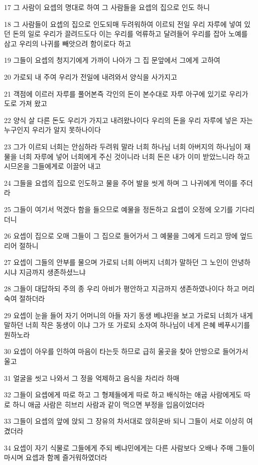 \par 17 그 사람이 요셉의 명대로 하여 그 사람들을 요셉의 집으로 인도 하니
\par 18 그 사람들이 요셉의 집으로 인도되매 두려워하여 이르되 전일 우리 자루에 넣여 있던 돈의 일로 우리가 끌려드도다 이는 우리를 억류하고 달려들어 우리를 잡아 노예를 삼고 우리의 나귀를 빼앗으려 함이로다 하고
\par 19 그들이 요셉의 청지기에게 가까이 나아가 그 집 문앞에서 그에게 고하여
\par 20 가로되 내 주여 우리가 전일에 내려와서 양식을 사가지고
\par 21 객점에 이르러 자루를 풀어본즉 각인의 돈이 본수대로 자루 아구에 있기로 우리가 도로 가져 왔고
\par 22 양식 살 다른 돈도 우리가 가지고 내려왔나이다 우리의 돈을 우리 자루에 넣은 자는 누구인지 우리가 알지 못하나이다
\par 23 그가 이르되 너희는 안심하라 두려워 말라 너희 하나님 너희 아버지의 하나님이 재물을 너희 자루에 넣어 너희에게 주신 것이니라 너희 돈은 내가 이미 받았느니라 하고 시므온을 그들에게로 이끌어 내고
\par 24 그들을 요셉의 집으로 인도하고 물을 주어 발을 씻게 하며 그 나귀에게 먹이를 주더라
\par 25 그들이 여기서 먹겠다 함을 들으므로 예물을 정돈하고 요셉이 오정에 오기를 기다리더니
\par 26 요셉이 집으로 오매 그들이 그 집으로 들어가서 그 예물을 그에게 드리고 땅에 엎드리어 절하니
\par 27 요셉이 그들의 안부를 물으며 가로되 너희 아버지 너희가 말하던 그 노인이 안녕하시냐 지금까지 생존하셨느냐
\par 28 그들이 대답하되 주의 종 우리 아비가 평안하고 지금까지 생존하였나이다 하고 머리 숙여 절하더라
\par 29 요셉이 눈을 들어 자기 어머니의 아들 자기 동생 베냐민을 보고 가로되 너희가 내게 말하던 너희 작은 동생이 이냐 그가 또 가로되 소자여 하나님이 네게 은혜 베푸시기를 원하노라
\par 30 요셉이 아우를 인하여 마음이 타는듯 하므로 급히 울곳을 찾아 안방으로 들어가서 울고
\par 31 얼굴을 씻고 나와서 그 정을 억제하고 음식을 차리라 하매
\par 32 그들이 요셉에게 따로 하고 그 형제들에게 따로 하고 배식하는 애굽 사람에게도 따로 하니 애굽 사람은 히브리 사람과 같이 먹으면 부정을 입음이었더라
\par 33 그들이 요셉의 앞에 앉되 그 장유의 차서대로 앉히운바 되니 그들이 서로 이상히 여겼더라
\par 34 요셉이 자기 식물로 그들에게 주되 베냐민에게는 다른 사람보다 오배나 주매 그들이 마시며 요셉과 함께 즐거워하였더라

